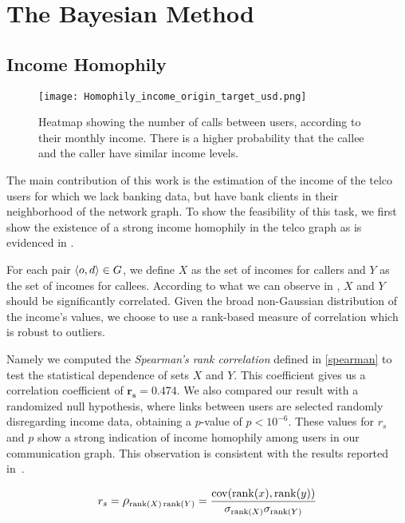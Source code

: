 \section{The Bayesian Method}
\label{inference_methodology}

\subsection{Income Homophily}

\begin{figure}[ht]
	\texttt{[image: Homophily\_income\_origin\_target\_usd.png]}
	\caption{Heatmap showing the number of calls between users, according to their monthly income. There is a higher probability that the callee and the caller have similar income levels.}
\label{homophily_heatmap}
\end{figure}

The main contribution of this work is the estimation of the income of the telco users for which we lack banking data, but have bank clients in their neighborhood of the network graph. To show the feasibility of this task, we first show the existence of a strong income homophily in the telco graph as is evidenced in .

For each pair $\left< o, d \right> \in \mathlarger{G}$, we define $X$ as the set of incomes for callers and $Y$ as the set of incomes for callees. According to what we can observe in , $X$ and $Y$ should be significantly correlated. Given the broad non-Gaussian distribution of the income's values, we choose to use a rank-based measure of correlation which is robust to outliers.

Namely we computed the \textit{Spearman's rank correlation} defined in \cref{spearman} to test the statistical dependence of sets $X$ and $Y$. This coefficient gives us a correlation coefficient of $\mathbf{r_s = 0.474}$. We also compared our result with a randomized null hypothesis, where links between users are selected randomly disregarding income data, obtaining a $p$-value of $p < 10^{-6}$. These values for $r_s$ and $p$ show a strong indication of income homophily among users in our communication graph. This observation is consistent with the results reported in~\cite{leo2015socioeconomic}.

\begin{equation}
r_s = \mathlarger{\rho}_{\operatorname{rank}(X) \operatorname{rank}(Y)} = \frac{\operatorname{cov}(\operatorname{rank}(x), \operatorname{rank}(y))}{\sigma_{\operatorname{rank}(X)} \sigma_{\operatorname{rank}(Y)}}
\label{spearman}
\end{equation}

